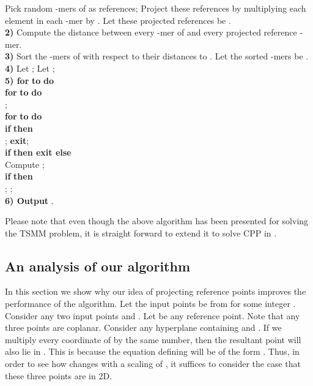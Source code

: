 \documentclass{article}
\theoremstyle{definition}
\theoremstyle{remark}
\begin{document}
\vspace{-0.15in}
  Pick  random -mers of  as references; Project these
references by multiplying each element in each -mer
 by . Let these projected references be .\\
 {\bf 2)} Compute the distance between every -mer of  and
 every projected reference -mer.\\
{\bf 3)} Sort the -mers of  with respect to their distances
 to . Let the sorted -mers be
.\\
{\bf 4)} Let ; Let ;\\
{\bf 5) for}  {\bf to}  {\bf do}\\
\hspace*{0.4in} {\bf for}  {\bf to}  {\bf do}\\
\hspace*{0.7in} ;\\
\hspace*{0.7in} {\bf for}  {\bf to}  {\bf do}\\
\hspace*{0.9in} {\bf if}  {\bf then}\\
\hspace*{1.1in} ; {\bf exit};\\
\hspace*{0.7in} {\bf if}  {\bf then exit else}\\
\hspace*{0.9in} Compute ; \\
\hspace*{0.9in} {\bf if}  {\bf then}\\
\hspace*{1.1in} ; ;\\
{\bf 6) Output} .

 Please note that even though the above algorithm has been presented for solving the TSMM problem, it is straight forward to extend it to solve CPP in .

\subsection{An analysis of our algorithm}
In this section we show why our idea of projecting reference points improves the performance of the algorithm. Let the input points be from  for some integer . Consider any two input points  and . Let  be any reference point. Note that any three points are coplanar. Consider any hyperplane  containing  and . If we multiply every coordinate of  by the same number, then the resultant point will also lie in . This is because the equation defining  will be of the form . Thus, in order to see how  changes with a scaling of , it suffices to consider the case that these three points are in 2D.
\end{document}
